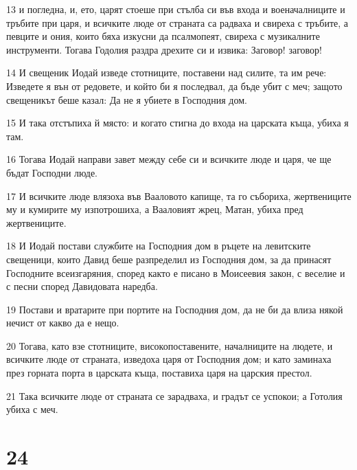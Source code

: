 \par 13 и погледна, и, ето, царят стоеше при стълба си във входа и военачалниците и тръбите при царя, и всичките люде от страната са радваха и свиреха с тръбите, а певците и ония, които бяха изкусни да псалмопеят, свиреха с музикалните инструменти. Тогава Годолия раздра дрехите си и извика: Заговор! заговор!
\par 14 И свещеник Иодай изведе стотниците, поставени над силите, та им рече: Изведете я вън от редовете, и който би я последвал, да бъде убит с меч; защото свещеникът беше казал: Да не я убиете в Господния дом.
\par 15 И така отстъпиха й място: и когато стигна до входа на царската къща, убиха я там.
\par 16 Тогава Иодай направи завет между себе си и всичките люде и царя, че ще бъдат Господни люде.
\par 17 И всичките люде влязоха във Вааловото капище, та го събориха, жертвениците му и кумирите му изпотрошиха, а Вааловият жрец, Матан, убиха пред жертвениците.
\par 18 И Иодай постави службите на Господния дом в ръцете на левитските свещеници, които Давид беше разпределил из Господния дом, за да принасят Господните всеизгаряния, според както е писано в Моисеевия закон, с веселие и с песни според Давидовата наредба.
\par 19 Постави и вратарите при портите на Господния дом, да не би да влиза някой нечист от какво да е нещо.
\par 20 Тогава, като взе стотниците, високопоставените, началниците на людете, и всичките люде от страната, изведоха царя от Господния дом; и като заминаха през горната порта в царската къща, поставиха царя на царския престол.
\par 21 Така всичките люде от страната се зарадваха, и градът се успокои; а Готолия убиха с меч.

\chapter{24}

